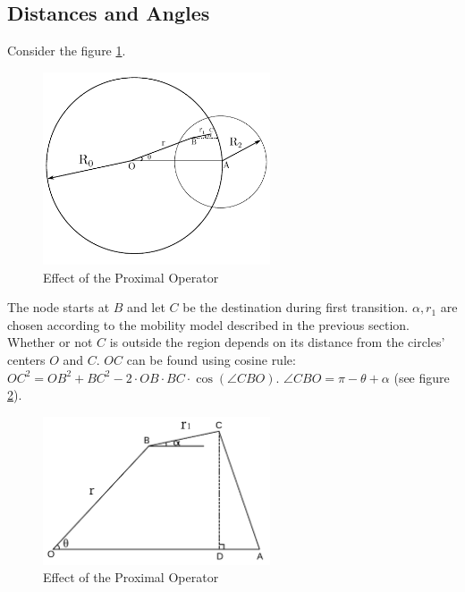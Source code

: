 \subsection{Distances and Angles}
Consider the figure \ref{fig:rr1}. 
\begin{figure}[h]
    \centering \vspace{-0.1in}
    \includegraphics[width=0.6\textwidth]{images/geo1.pdf}
    \vspace{-20pt} \caption[Effect of the proximal Operator]{\small Effect of the Proximal Operator \footnotemark}
    \label{fig:rr1}
\end{figure}
The node starts at $B$ and let $C$ be 
the destination during first transition. $\alpha, r_1$ are chosen according to the mobility 
model described in the previous section. Whether or not $C$ is outside the region depends on
its distance from the circles' centers $O$ and $C$. $OC$ can be found using cosine rule:
$OC^2 = OB^2 + BC^2 - 2 \cdot OB \cdot BC \cdot \cos(\angle CBO)$. $\angle CBO = \pi-\theta+\alpha$ (see figure \ref{fig:ocac}).
\begin{figure}[h]
    \centering \vspace{-0.1in}
    \includegraphics[width=0.6\textwidth]{images/geo2.pdf}
    \vspace{-20pt} \caption[Effect of the proximal Operator]{\small Effect of the Proximal Operator }
    \label{fig:ocac}
\end{figure}

